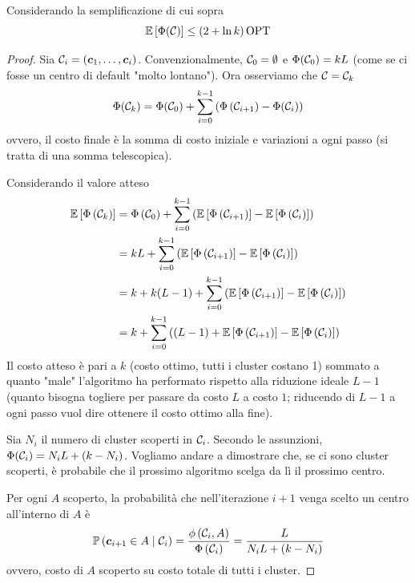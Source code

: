 \begin{lemma}
    Considerando la semplificazione di cui sopra
    $$ \mathbb{E} \left[\Phi (\mathcal{C})\right] \leq \left(2 + \ln k\right) \textnormal{OPT} $$
\end{lemma}
\begin{proof}
    Sia $\mathcal{C}_i = \left(\bm c_1, \dots, \bm c_i\right)$. Convenzionalmente, $\mathcal{C}_0 = \emptyset$ e $\Phi (\mathcal{C}_0) = kL$ (come se ci fosse un centro di default "molto lontano"). Ora osserviamo che $\mathcal{C} = \mathcal{C}_k$
    $$ \Phi (\mathcal{C}_k) = \Phi (\mathcal{C}_0) + \sum_{i = 0}^{k-1} \left(\Phi \left(\mathcal{C}_{i+1}\right) - \Phi (\mathcal{C}_i)\right) $$
    ovvero, il costo finale è la somma di costo iniziale e variazioni a ogni passo (si tratta di una somma telescopica).

    Considerando il valore atteso
    \begin{align*}
        \mathbb{E} \left[\Phi \left( \mathcal{C}_k \right)\right] & = \Phi \left(\mathcal{C}_0\right) + \sum_{i = 0}^{k-1} \left(\mathbb{E} \left[\Phi \left(\mathcal{C}_{i+1}\right)\right] - \mathbb{E} \left[\Phi \left(\mathcal{C}_i \right)\right]\right) \\
        & = k L + \sum_{i = 0}^{k-1} \left(\mathbb{E} \left[\Phi\left(\mathcal{C}_{i+1}\right)\right] - \mathbb{E} \left[\Phi \left(\mathcal{C}_i\right)\right]\right) \\
        & = k + k (L - 1) + \sum_{i = 0}^{k-1} \left(\mathbb{E} \left[\Phi\left(\mathcal{C}_{i+1}\right)\right] - \mathbb{E} \left[\Phi \left(\mathcal{C}_i\right)\right]\right) \\
        &= k + \sum_{i = 0}^{k-1} \left(\left(L-1\right) + \mathbb{E} \left[\Phi \left(\mathcal{C}_{i+1}\right)\right] - \mathbb{E} \left[\Phi \left(\mathcal{C}_i \right)\right]\right)
    \end{align*}
    Il costo atteso è pari a $k$ (costo ottimo, tutti i cluster costano 1) sommato a quanto "male" l'algoritmo ha performato rispetto alla riduzione ideale $L - 1$ (quanto bisogna togliere per passare da costo $L$ a costo $1$; riducendo di $L - 1$ a ogni passo vuol dire ottenere il costo ottimo alla fine).

    Sia $N_i$ il numero di cluster scoperti in $\mathcal{C}_i$. Secondo le assunzioni, $\Phi (\mathcal{C}_i) = N_i L + \left(k - N_i\right)$. Vogliamo andare a dimostrare che, se ci sono cluster scoperti, è probabile che il prossimo algoritmo scelga da lì il prossimo centro.

    Per ogni $A$ scoperto, la probabilità che nell'iterazione $i+1$ venga scelto un centro all'interno di $A$ è
    $$ \mathbb{P} \left(\bm c_{i+1} \in A \mid \mathcal{C}_i \right) = \frac{\phi \left(\mathcal{C}_i, A\right)}{\Phi \left(\mathcal{C}_i\right)} = \frac{L}{N_i L + \left(k - N_i\right)} $$
    ovvero, costo di $A$ scoperto su costo totale di tutti i cluster.


\end{proof}
